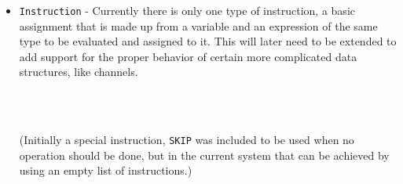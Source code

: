\begin{itemize}
    
    \item \verb|Instruction| - Currently there is only one type of instruction, a basic assignment that is made up from a variable and an expression of the same type to be evaluated and assigned to it. This will later need to be extended to add support for the proper behavior of certain more complicated data structures, like channels. 
    \begin{code}
        \>[2]\AgdaSpace{}%
        \AgdaSpace{}%
        \AgdaSymbol{:}\AgdaSpace{}%
        \AgdaSpace{}%
        \<%
        \\
        \>[2][@{}l@{\AgdaIndent{0}}]%
        \>[4]\<%
        \\
        \>[4]\AgdaSpace{}%
        \AgdaSymbol{:}\AgdaSpace{}%
        \AgdaSymbol{(}\AgdaSpace{}%
        \AgdaSymbol{:}\AgdaSpace{}%
        \AgdaSymbol{)}\AgdaSpace{}%
        \AgdaSpace{}%
        \AgdaSpace{}%
        \AgdaSymbol{(}\AgdaSpace{}%
        \AgdaSymbol{)}\AgdaSpace{}%
        \AgdaSpace{}%
        \<%
    \end{code}
    (Initially a special instruction, \verb|SKIP| was included to be used when no operation should
    be done, but in the current system that can be achieved by using an empty list of instructions.)
    
\end{itemize}

\newcommand{\sem}[2]{\llbracket #1 \rrbracket #2}

